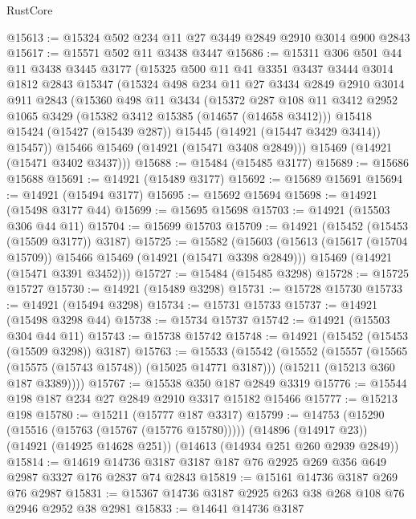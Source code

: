 \begin{lexlean}{RustCore}
\begin{coremodule}
@15613 := @15324 @502 @234 @11 @27 @3449 @2849 @2910 @3014 @900 @2843
@15617 := @15571 @502 @11 @3438 @3447
@15686 := @15311
    @306
    @501
    @44
    @11
    @3438
    @3445
    @3177
    (@15325
      @500
      @11
      @41
      @3351
      @3437
      @3444
      @3014
      @1812
      @2843
      @15347
      (@15324
        @498
        @234
        @11
        @27
        @3434
        @2849
        @2910
        @3014
        @911
        @2843
        (@15360
          @498
          @11
          @3434
          (@15372
            @287
            @108
            @11
            @3412
            @2952
            @1065
            @3429
            (@15382 @3412 @15385 (@14657 (@14658 @3412)))
            @15418
            @15424
            (@15427 (@15439 @287))
            @15445
            (@14921 (@15447 @3429 @3414))
            @15457))
        @15466
        @15469
        (@14921 (@15471 @3408 @2849)))
      @15469
      (@14921 (@15471 @3402 @3437)))
@15688 := @15484 (@15485 @3177)
@15689 := @15686 @15688
@15691 := @14921 (@15489 @3177)
@15692 := @15689 @15691
@15694 := @14921 (@15494 @3177)
@15695 := @15692 @15694
@15698 := @14921 (@15498 @3177 @44)
@15699 := @15695 @15698
@15703 := @14921 (@15503 @306 @44 @11)
@15704 := @15699 @15703
@15709 := @14921 (@15452 (@15453 (@15509 @3177)) @3187)
@15725 := @15582
    (@15603
      (@15613 (@15617 (@15704 @15709)) @15466 @15469 (@14921 (@15471 @3398 @2849)))
      @15469
      (@14921 (@15471 @3391 @3452)))
@15727 := @15484 (@15485 @3298)
@15728 := @15725 @15727
@15730 := @14921 (@15489 @3298)
@15731 := @15728 @15730
@15733 := @14921 (@15494 @3298)
@15734 := @15731 @15733
@15737 := @14921 (@15498 @3298 @44)
@15738 := @15734 @15737
@15742 := @14921 (@15503 @304 @44 @11)
@15743 := @15738 @15742
@15748 := @14921 (@15452 (@15453 (@15509 @3298)) @3187)
@15763 := @15533
    (@15542
      (@15552
        (@15557 (@15565 (@15575 (@15743 @15748)) (@15025 @14771 @3187)))
        (@15211 (@15213 @360 @187 @3389))))
@15767 := @15538 @350 @187 @2849 @3319
@15776 := @15544 @198 @187 @234 @27 @2849 @2910 @3317 @15182 @15466
@15777 := @15213 @198
@15780 := @15211 (@15777 @187 @3317)
@15799 := @14753
    (@15290 (@15516 (@15763 (@15767 (@15776 @15780)))))
    (@14896 (@14917 @23))
    (@14921 (@14925 @14628 @251))
    (@14613 (@14934 @251 @260 @2939 @2849))
@15814 := @14619 @14736 @3187 @3187 @187 @76 @2925 @269 @356 @649 @2987 @3327 @176 @2837 @74 @2843
@15819 := @15161 @14736 @3187 @269 @76 @2987
@15831 := @15367 @14736 @3187 @2925 @263 @38 @268 @108 @76 @2946 @2952 @38 @2981
@15833 := @14641 @14736 @3187

\end{coremodule}
\end{lexlean}
